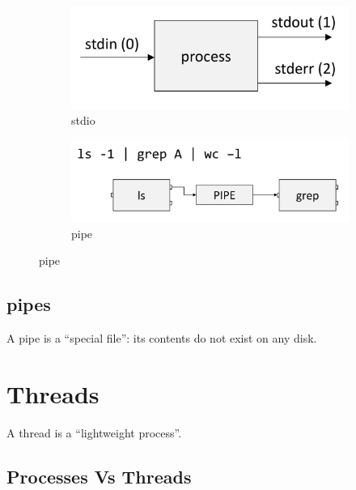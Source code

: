 \documentclass{article}
\begin{document}
\begin{figure}[h]
    \centering
    \begin{subfigure}{0.45\textwidth}
        \includegraphics[scale=0.2]{images/stdio.png}
        \caption{stdio}
        \label{fig:my_label}
    \end{subfigure}
    \begin{subfigure}{0.45\textwidth}
        \includegraphics[scale=0.2]{images/pipe.png}
        \caption{pipe}
        \label{fig:my_label}
    \end{subfigure}
\end{figure}

\subsection{pipes}

A pipe is a “special file”: its contents do not exist on any disk.



\section{Threads}

A thread is a “lightweight process”.

\subsection{Processes Vs Threads}
\end{document}
